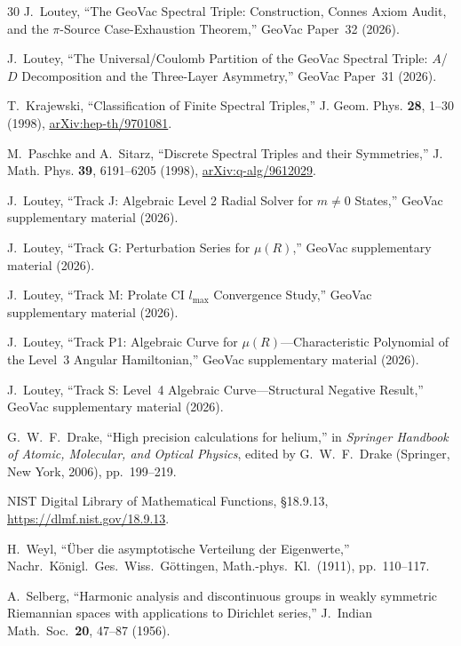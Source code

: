 \documentclass[aps,pra,twocolumn,superscriptaddress,longbibliography]{revtex4-2}
\begin{document}
\begin{thebibliography}{30}
J.~Loutey,
``The GeoVac Spectral Triple: Construction, Connes Axiom Audit,
and the $\pi$-Source Case-Exhaustion Theorem,''
GeoVac Paper~32 (2026).

J.~Loutey,
``The Universal/Coulomb Partition of the GeoVac Spectral Triple:
$A$/$D$ Decomposition and the Three-Layer Asymmetry,''
GeoVac Paper~31 (2026).

T.~Krajewski,
``Classification of Finite Spectral Triples,''
J. Geom. Phys. \textbf{28}, 1--30 (1998),
\href{https://arxiv.org/abs/hep-th/9701081}{arXiv:hep-th/9701081}.

M.~Paschke and A.~Sitarz,
``Discrete Spectral Triples and their Symmetries,''
J. Math. Phys. \textbf{39}, 6191--6205 (1998),
\href{https://arxiv.org/abs/q-alg/9612029}{arXiv:q-alg/9612029}.

J.~Loutey,
``Track J: Algebraic Level 2 Radial Solver for $m \neq 0$ States,''
GeoVac supplementary material (2026).

J.~Loutey,
``Track G: Perturbation Series for $\mu(R)$,''
GeoVac supplementary material (2026).

J.~Loutey,
``Track M: Prolate CI $l_{\max}$ Convergence Study,''
GeoVac supplementary material (2026).

J.~Loutey,
``Track P1: Algebraic Curve for $\mu(R)$---Characteristic Polynomial
of the Level~3 Angular Hamiltonian,''
GeoVac supplementary material (2026).

J.~Loutey,
``Track S: Level~4 Algebraic Curve---Structural Negative Result,''
GeoVac supplementary material (2026).

G.~W.~F.~Drake,
``High precision calculations for helium,''
in \textit{Springer Handbook of Atomic, Molecular, and Optical Physics},
edited by G.~W.~F.~Drake (Springer, New York, 2006), pp.~199--219.

NIST Digital Library of Mathematical Functions,
\S18.9.13, \url{https://dlmf.nist.gov/18.9.13}.

H.~Weyl,
``\"Uber die asymptotische Verteilung der Eigenwerte,''
Nachr.\ K\"onigl.\ Ges.\ Wiss.\ G\"ottingen, Math.-phys.\ Kl.\
(1911), pp.\ 110--117.

A.~Selberg,
``Harmonic analysis and discontinuous groups in weakly symmetric
Riemannian spaces with applications to Dirichlet series,''
J.\ Indian Math.\ Soc.\ \textbf{20}, 47--87 (1956).


\end{thebibliography}
\end{document}
